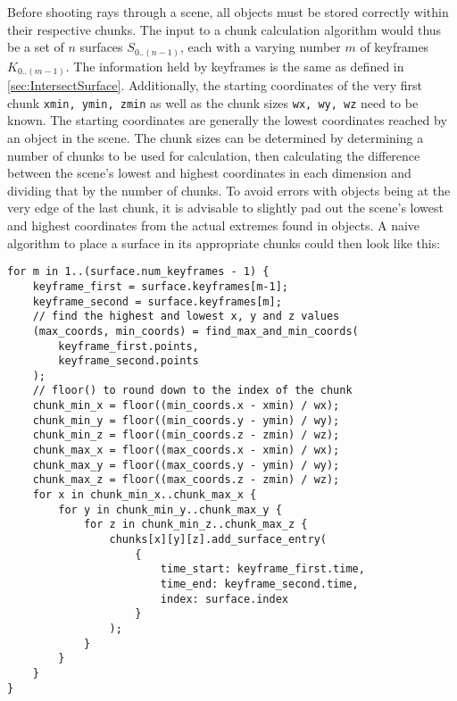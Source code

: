Before shooting rays through a scene,
all objects must be stored correctly within their respective chunks.
The input to a chunk calculation algorithm would thus be a set of \(n\) surfaces \(S_{0..(n-1)}\),
each with a varying number \(m\) of keyframes \(K_{0..(m-1)}\).
The information held by keyframes is the same as defined in \autoref{sec:IntersectSurface}.
\newline
Additionally, the starting coordinates of the very first chunk \verb|xmin, ymin, zmin|
as well as the chunk sizes \verb|wx, wy, wz| need to be known.
The starting coordinates are generally the lowest coordinates reached by an object in the scene.
The chunk sizes can be determined by determining a number of chunks to be used for calculation,
then calculating the difference between the scene's lowest and highest coordinates in each dimension
and dividing that by the number of chunks.
To avoid errors with objects being at the very edge of the last chunk,
it is advisable to slightly pad out the scene's lowest and highest coordinates
from the actual extremes found in objects.
\newline
A naive algorithm to place a surface in its appropriate chunks could then look like this:
\begin{lstlisting}[basicstyle=\small, caption={[Naive chunk calculation]A naive chunk calculation algorithm}, label={lst:naive}]
for m in 1..(surface.num_keyframes - 1) {
    keyframe_first = surface.keyframes[m-1];
    keyframe_second = surface.keyframes[m];
    // find the highest and lowest x, y and z values
    (max_coords, min_coords) = find_max_and_min_coords(
        keyframe_first.points,
        keyframe_second.points
    );
    // floor() to round down to the index of the chunk
    chunk_min_x = floor((min_coords.x - xmin) / wx);
    chunk_min_y = floor((min_coords.y - ymin) / wy);
    chunk_min_z = floor((min_coords.z - zmin) / wz);
    chunk_max_x = floor((max_coords.x - xmin) / wx);
    chunk_max_y = floor((max_coords.y - ymin) / wy);
    chunk_max_z = floor((max_coords.z - zmin) / wz);
    for x in chunk_min_x..chunk_max_x {
        for y in chunk_min_y..chunk_max_y {
            for z in chunk_min_z..chunk_max_z {
                chunks[x][y][z].add_surface_entry(
                    {
                        time_start: keyframe_first.time,
                        time_end: keyframe_second.time,
                        index: surface.index
                    }
                );
            }
        }
    }
}
\end{lstlisting}

